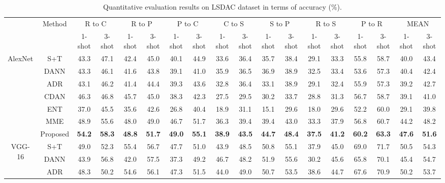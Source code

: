 \documentclass[a4paper,conference]{IEEEtran}
\begin{document}
\begin{table*}[!t]
\centering
\caption{Quantitative evaluation results on LSDAC dataset in terms of accuracy (\%).}
\begin{tabular}{c|c|c@{\,\;}c@{\,\;}c@{\,\;}c@{\,\;}c@{\,\;}c@{\,\;}c@{\,\;}c@{\,\;}c@{\,\;}c@{\,\;}c@{\,\;}c@{\,\;}c@{\,\;}c | c@{\,\;}c}
\Xhline{4\arrayrulewidth}
\multirow{2}{*}{Net} & \multirow{2}{*}{Method} & \multicolumn{2}{c}{R to C} & \multicolumn{2}{c}{R to P} & \multicolumn{2}{c}{P to C} & \multicolumn{2}{c}{C to S} & \multicolumn{2}{c}{S to P} & \multicolumn{2}{c}{R to S} & \multicolumn{2}{c|}{P to R} & \multicolumn{2}{c}{MEAN}\\
& & 1-shot & 3-shot & 1-shot & 3-shot & 1-shot & 3-shot & 1-shot & 3-shot & 1-shot & 3-shot & 1-shot & 3-shot & 1-shot & 3-shot & 1-shot & 3-shot\\
\hline
\multirow{7}{*}{AlexNet} & S+T & 43.3 & 47.1 & 42.4 & 45.0 & 40.1 & 44.9 & 33.6 & 36.4 & 35.7 & 38.4 & 29.1 & 33.3 & 55.8 & 58.7 & 40.0 & 43.4\\
& DANN & 43.3 & 46.1 & 41.6 & 43.8 & 39.1 & 41.0 & 35.9 & 36.5 & 36.9 & 38.9 & 32.5 & 33.4 & 53.6 & 57.3 & 40.4 & 42.4\\
& ADR & 43.1 & 46.2 & 41.4 & 44.4 & 39.3 & 43.6 & 32.8 & 36.4 & 33.1 & 38.9 & 29.1 & 32.4 & 55.9 & 57.3 & 39.2 & 42.7\\
& CDAN & 46.3 & 46.8 & 45.7 & 45.0 & 38.3 & 42.3 & 27.5 & 29.5 & 30.2 & 33.7 & 28.8 & 31.3 & 56.7 & 58.7 & 39.1 & 41.0\\
& ENT & 37.0 & 45.5 & 35.6 & 42.6 & 26.8 & 40.4 & 18.9 & 31.1 & 15.1 & 29.6 & 18.0 & 29.6 & 52.2 & 60.0 & 29.1 & 39.8\\
& MME & 48.9 & 55.6 & 48.0 & 49.0 & 46.7 & 51.7 & 36.3 & 39.4 & 39.4 & 43.0 & 33.3 & 37.9 & 56.8 & 60.7 & 44.2 & 48.2\\
& Proposed & \textbf{54.2} & \textbf{58.3} & \textbf{48.8} & \textbf{51.7} & \textbf{49.0} & \textbf{55.1} & \textbf{38.9} & \textbf{43.5} & \textbf{44.7} & \textbf{48.4} & \textbf{37.5} & \textbf{41.2} & \textbf{60.2} & \textbf{63.3} & \textbf{47.6} & \textbf{51.6}\\
\hline\hline
\multirow{7}{*}{VGG-16} & S+T & 49.0 & 52.3 & 55.4 & 56.7 & 47.7 & 51.0 & 43.9 & 48.5 & 50.8 & 55.1 & 37.9 & 45.0 & 69.0 & 71.7 & 50.5 & 54.3\\
& DANN & 43.9 & 56.8 & 42.0 & 57.5 & 37.3 & 49.2 & 46.7 & 48.2 & 51.9 & 55.6 & 30.2 & 45.6 & 65.8 & 70.1 & 45.4 & 54.7\\
& ADR & 48.3 & 50.2 & 54.6 & 56.1 & 47.3 & 51.5 & 44.0 & 49.0 & 50.7 & 53.5 & 38.6 & 44.7 & 67.6 & 70.9 & 50.2 & 53.7\\

\end{tabular}
\end{table*}
\end{document}
